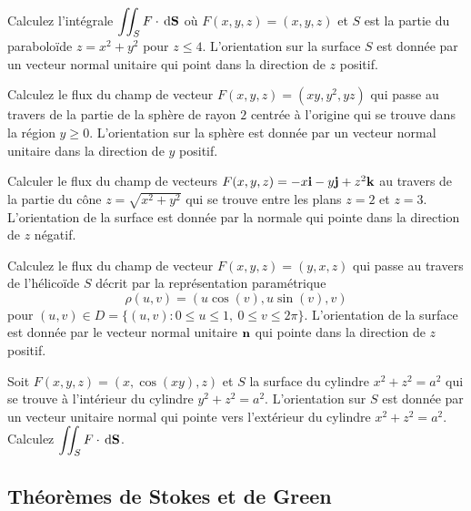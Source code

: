 \begin{question}
Calculez l'intégrale $\displaystyle \iint_S F \cdot \,\mathrm{d}\mathbf{S}$
où $F(x,y,z) = (x,y,z)$ et $S$ est la partie du paraboloïde
$z = x^2+y^2$ pour $z\leq 4$.  L'orientation sur la surface $S$ est
donnée par un vecteur normal unitaire qui point dans la direction
de $z$ positif.
\label{17Q17}
\end{question}

\begin{question}
Calculez le flux du champ de vecteur $F(x,y,z) = (xy,y^2,yz)$
qui passe au travers de la partie de la sphère de rayon $2$ centrée à
l'origine qui se trouve dans la région $y\geq 0$.  L'orientation sur
la sphère est donnée par un vecteur normal unitaire dans la direction
de $y$ positif.
\label{17Q18}
\end{question}

\begin{question}
Calculer le flux du champ de vecteurs
$F(x,y,z) = -x\mathbf{i} - y\mathbf{j} + z^2\mathbf{k}$  au travers de la partie du
cône $z=\sqrt{x^2+y^2}$ qui se trouve entre les plans $z=2$ et $z=3$.
L'orientation de la surface est donnée par la normale qui pointe
dans la direction de $z$ négatif.
\label{17Q19}
\end{question}

\begin{question}
Calculez le flux du champ de vecteur $F(x,y,z) = (y,x,z)$
qui passe au travers de l'hélicoïde $S$ décrit par la représentation
paramétrique
\[
  \rho(u,v) = (u \cos(v) , u \sin(v), v)
\]
pour $(u,v) \in D = \{(u,v) : 0\leq u \leq 1,\ 0\leq v \leq 2\pi \}$.
L'orientation de la surface est donnée par le vecteur normal unitaire
$\mathbf{n}$ qui pointe dans la direction de $z$ positif.
\label{17Q20}
\end{question}

\begin{question}
Soit $F(x,y,z) = (x, \cos(xy) , z)$ et $S$ la surface du
cylindre $x^2+z^2 = a^2$ qui se trouve à l'intérieur du cylindre
$y^2+z^2=a^2$.  L'orientation sur $S$ est donnée par un vecteur
unitaire normal qui pointe vers l'extérieur du cylindre
$x^2 + z^2 = a^2$.  Calculez
$\displaystyle \iint_S F \cdot \,\mathrm{d}\mathbf{S}$.
\label{17Q21}
\end{question}

\subsection{Théorèmes de Stokes et de Green}

